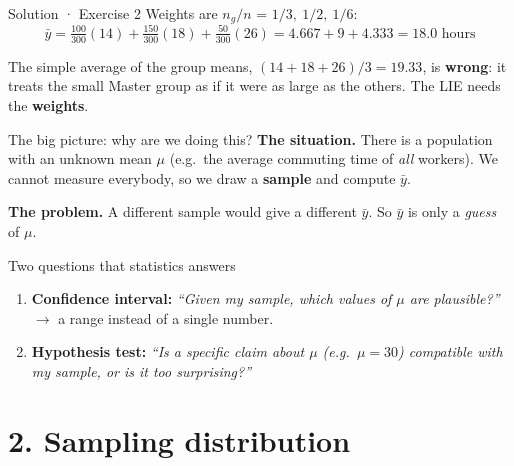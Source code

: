\documentclass[
  11pt,
  ignorenonframetext,
  aspectratio=169,
]{beamer}
\providecommand{\tightlist}{%
  \setlength{\itemsep}{0pt}\setlength{\parskip}{0pt}}
\begin{document}
\begin{frame}{Solution · Exercise 2}
\protect{}\label{solution-exercise-2}
Weights are \(n_g/n\) = \(1/3,\ 1/2,\ 1/6\):
\[\bar y=\tfrac{100}{300}(14)+\tfrac{150}{300}(18)+\tfrac{50}{300}(26)=4.667+9+4.333=\mathbf{18.0}\text{ hours}\]

The simple average of the group means, \((14+18+26)/3=19.33\), is
\textbf{wrong}: it treats the small Master group as if it were as large
as the others. The LIE needs the \textbf{weights}.
\end{frame}

\begin{frame}{The big picture: why are we doing this?}
\protect{}\label{the-big-picture-why-are-we-doing-this}
\textbf{The situation.} There is a population with an unknown mean
\(\mu\) (e.g.~the average commuting time of \emph{all} workers). We
cannot measure everybody, so we draw a \textbf{sample} and compute
\(\bar y\).

\textbf{The problem.} A different sample would give a different
\(\bar y\). So \(\bar y\) is only a \emph{guess} of \(\mu\).

\begin{block}{Two questions that statistics answers}
\protect{}\label{two-questions-that-statistics-answers}
\begin{enumerate}
\tightlist
\item
  \textbf{Confidence interval:} \emph{``Given my sample, which values of
  \(\mu\) are plausible?''} \(\to\) a range instead of a single number.
\item
  \textbf{Hypothesis test:} \emph{``Is a specific claim about \(\mu\)
  (e.g.~\(\mu=30\)) compatible with my sample, or is it too
  surprising?''}
\end{enumerate}
\end{block}
\end{frame}


\section{2. Sampling distribution}\label{sampling-distribution-clt}
\end{document}
